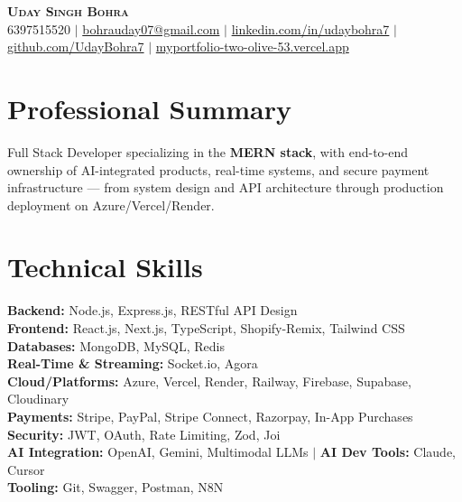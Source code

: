\documentclass[letterpaper,11pt]{article}
\begin{document}
\begin{center}
    \textbf{\Huge \scshape Uday Singh Bohra} \\ \vspace{1pt}
    \small 6397515520 $|$ 
    \href{mailto:bohrauday07@gmail.com}{bohrauday07@gmail.com} $|$ 
    \href{https://www.linkedin.com/in/udaybohra7/}{linkedin.com/in/udaybohra7} $|$
    \href{https://github.com/UdayBohra7}{github.com/UdayBohra7} $|$
    \href{https://myportfolio-two-olive-53.vercel.app/}{myportfolio-two-olive-53.vercel.app}
\end{center}

\section{Professional Summary}
\begin{itemize}[leftmargin=0.15in, label={}]
\small{\item{
Full Stack Developer specializing in the \textbf{MERN stack}, with end-to-end ownership of AI-integrated products, real-time systems, and secure payment infrastructure — from system design and API architecture through production deployment on Azure/Vercel/Render.
}}
\end{itemize}

\section{Technical Skills}
 \begin{itemize}[leftmargin=0.15in, label={}]
    \small{\item{
     \textbf{Backend:} Node.js, Express.js, RESTful API Design \\
     \textbf{Frontend:} React.js, Next.js, TypeScript, Shopify-Remix, Tailwind CSS \\
     \textbf{Databases:} MongoDB, MySQL, Redis \\
     \textbf{Real-Time \& Streaming:} Socket.io, Agora \\
     \textbf{Cloud/Platforms:} Azure, Vercel, Render, Railway, Firebase, Supabase, Cloudinary \\
     \textbf{Payments:} Stripe, PayPal, Stripe Connect, Razorpay, In-App Purchases \\
     \textbf{Security:} JWT, OAuth, Rate Limiting, Zod, Joi \\
     \textbf{AI Integration:} OpenAI, Gemini, Multimodal LLMs $|$ \textbf{AI Dev Tools:} Claude, Cursor \\
     \textbf{Tooling:} Git, Swagger, Postman, N8N
    }}
 \end{itemize}
\end{document}
